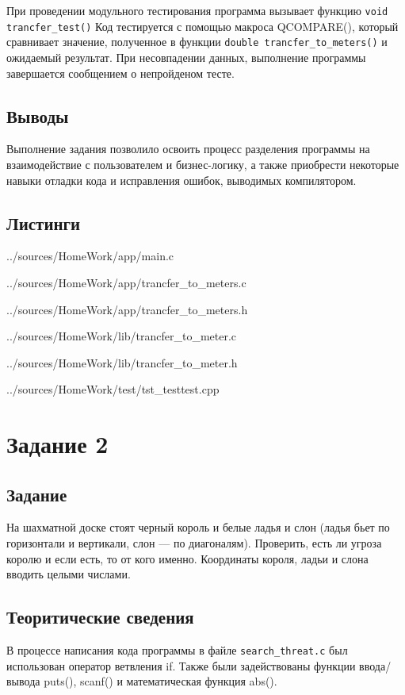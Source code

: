 \documentclass[12pt,a4paper]{report}
\begin{document}
При проведении модульного тестирования программа вызывает функцию \verb+void trancfer_test()+ Код тестируется с помощью макроса QCOMPARE(), который сравнивает значение, полученное в функции \verb+double trancfer_to_meters()+ и ожидаемый результат. При несовпадении данных, выполнение программы завершается сообщением о непройденом тесте.


\subsection{Выводы}

Выполнение задания позволило освоить процесс разделения программы на взаимодействие с пользователем и бизнес-логику, а также приобрести некоторые навыки отладки кода и исправления ошибок, выводимых компилятором.


\subsection*{Листинги}

{../sources/HomeWork/app/main.c}


{../sources/HomeWork/app/trancfer_to_meters.c}


{../sources/HomeWork/app/trancfer_to_meters.h}


{../sources/HomeWork/lib/trancfer_to_meter.c}


{../sources/HomeWork/lib/trancfer_to_meter.h}


{../sources/HomeWork/test/tst_testtest.cpp}



\section{Задание 2}
\subsection{Задание}
На шахматной доске стоят черный король и белые ладья и слон (ладья бьет по горизонтали и вертикали, слон — по диагоналям). Проверить, есть ли угроза королю и если есть, то от кого именно. Координаты короля, ладьи и слона вводить целыми числами.
\subsection{Теоритические сведения}
В процессе написания кода программы в файле \verb+search_threat.c+ был использован оператор ветвления if. Также были задействованы функции ввода/вывода puts(), scanf() и математическая функция abs().
\end{document}
